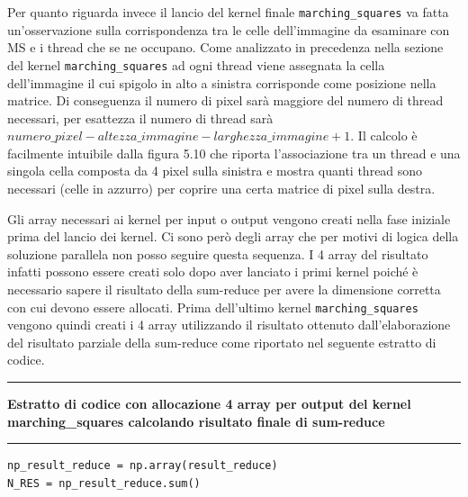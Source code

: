 \documentclass[12pt,a4paper]{report}
\begin{document}
{\newpage
Per quanto riguarda invece il lancio del kernel finale \verb|marching_squares| va fatta un'osservazione sulla corrispondenza tra le celle dell'immagine da esaminare con MS e i thread che se ne occupano. Come analizzato in precedenza nella sezione del kernel \verb|marching_squares| ad ogni thread viene assegnata la cella dell'immagine il cui spigolo in alto a sinistra corrisponde come posizione nella matrice. Di conseguenza il numero di pixel sarà maggiore del numero di thread necessari, per esattezza il numero di thread sarà $numero\_pixel - altezza\_immagine - larghezza\_immagine + 1$. Il calcolo è facilmente intuibile dalla figura 5.10 che riporta l'associazione tra un thread e una singola cella composta da 4 pixel sulla sinistra e mostra quanti thread sono necessari (celle in azzurro) per coprire una certa matrice di pixel sulla destra.

\begin{figure}[H]
\centering
\begin{floatrow}[1]
\end{floatrow}
\end{figure} 
\newpage
Gli array necessari ai kernel per input o output vengono creati nella fase iniziale prima del lancio dei kernel. Ci sono però degli array che per motivi di logica della soluzione parallela non posso seguire questa sequenza. I 4 array del risultato infatti possono essere creati solo dopo aver lanciato i primi kernel poiché è necessario sapere il risultato della sum-reduce per avere la dimensione corretta con cui devono essere allocati.
Prima dell'ultimo kernel \verb|marching_squares| vengono quindi creati i 4 array utilizzando il risultato ottenuto dall'elaborazione del risultato parziale della sum-reduce come riportato nel seguente estratto di codice. \\[10pt]
\noindent\rule[0.5ex]{\linewidth}{2pt}
\small{\textbf{Estratto di codice con allocazione 4 array per output del kernel marching\_squares calcolando risultato finale di sum-reduce}} \\
\noindent\rule[0.5ex]{\linewidth}{1pt}
\begin{lstlisting}
np_result_reduce = np.array(result_reduce) 
N_RES = np_result_reduce.sum() 


\end{lstlisting}}
\end{document}
